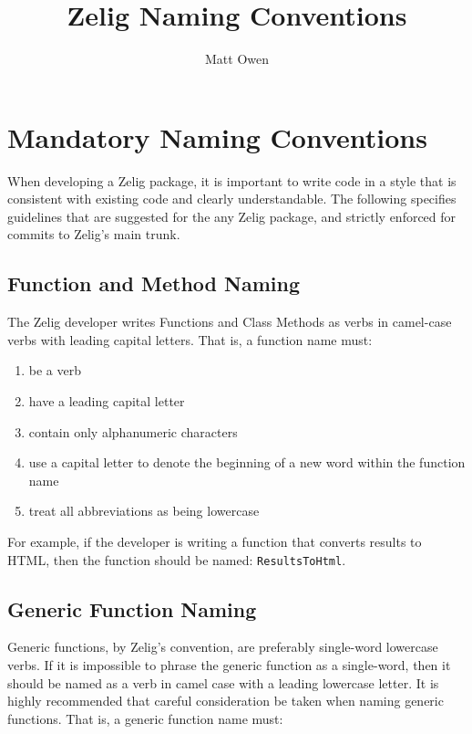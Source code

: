 \documentclass[a4paper,10pt]{article}
\begin{document}
%
\title{Zelig Naming Conventions}
\author{Matt Owen}
\maketitle


\section{Mandatory Naming Conventions}
When developing a Zelig package, it is important to write code in a style that is consistent with existing code and clearly understandable.  The following specifies guidelines that are suggested for the any Zelig package, and strictly enforced for commits to Zelig's main trunk.


\subsection{Function and Method Naming}
The Zelig developer writes Functions and Class Methods as verbs in camel-case verbs with leading capital letters.  That is, a function name must:

{\tt\begin{enumerate}
	\item{be a verb}
	\item{have a leading capital letter}
	\item{contain only alphanumeric characters}
	\item{use a capital letter to denote the beginning of a new word within the function name}
	\item{treat all abbreviations as being lowercase}
\end{enumerate}}

For example, if the developer is writing a function that converts results to HTML, then the function should be named: {\tt ResultsToHtml}.



\subsection{Generic Function Naming}
Generic functions, by Zelig's convention, are preferably single-word lowercase verbs.  If it is impossible to phrase the generic function as a single-word, then it should be named as a verb in camel case with a leading lowercase letter.  It is highly recommended that careful consideration be taken when naming generic functions.  That is, a generic function name must:
\end{document}
